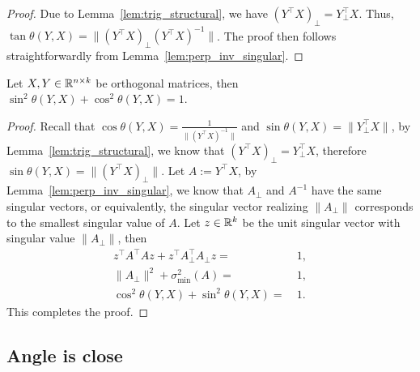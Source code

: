 \begin{proof}
Due to Lemma~\ref{lem:trig_structural}, we have $(Y^\top X)_\bot=Y^\top_\bot X$. Thus, $\tan\theta(Y,X)=\|(Y^\top X)_\bot (Y^\top X)^{-1}\|$. The proof then follows straightforwardly from Lemma~\ref{lem:perp_inv_singular}.
\end{proof}

\begin{lemma}\label{lem:sin^2_and_cos^2_is_1}
Let $X, Y\in \mathbb{R}^{n\times k}$ be orthogonal matrices, then $\sin^2\theta(Y, X) + \cos^2\theta(Y,X) =1$.
\end{lemma}
\begin{proof}
Recall that $\cos\theta(Y,X)=\frac{1}{\|(Y^\top X)^{-1}\|}$ and $\sin\theta(Y,X)=\|Y_\bot^\top X\|$, by Lemma~\ref{lem:trig_structural}, we know that $(Y^\top X)_\bot=Y^\top_\bot X$, therefore $\sin\theta(Y,X)=\|(Y^\top X)_\bot \|$. Let $A:=Y^\top X$, by Lemma~\ref{lem:perp_inv_singular}, we know that $A_\bot$ and $A^{-1}$ have the same singular vectors, or equivalently, the singular vector realizing $\|A_\bot\|$ corresponds to the smallest singular value of $A$. Let $z\in \mathbb{R}^k$ be the unit singular vector with singular value $\|A_\bot\|$, then
\begin{align*}
    z^\top A^\top Az+z^\top A_\bot^\top A_\bot z = & ~ 1, \\
    \|A_\bot\|^2+\sigma_{\min}^2(A) = & ~ 1, \\
    \cos^2\theta(Y,X)+\sin^2\theta(Y,X) = & ~ 1.
\end{align*}
This completes the proof.
\end{proof}


\subsection{Angle is close}

